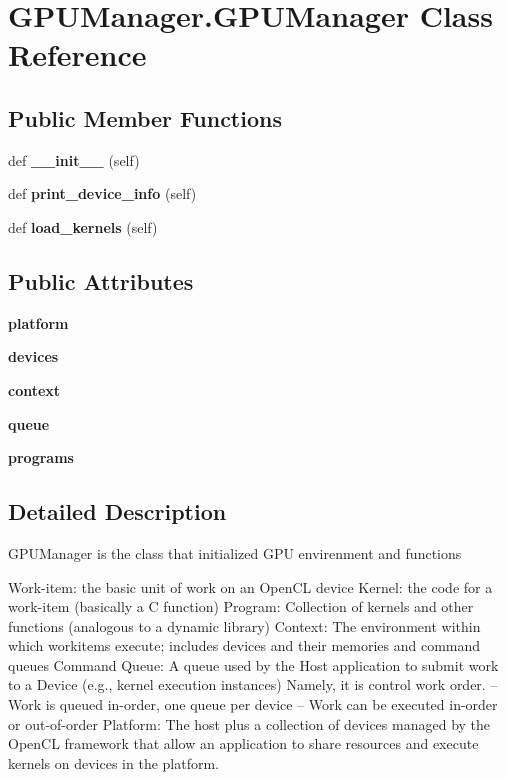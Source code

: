 \section{G\+P\+U\+Manager.\+G\+P\+U\+Manager Class Reference}
\label{class_g_p_u_manager_1_1_g_p_u_manager}
\subsection*{Public Member Functions}
\begin{DoxyCompactItemize}
\item 
def \textbf{ \+\_\+\+\_\+init\+\_\+\+\_\+} (self)
\item 
def \textbf{ print\+\_\+device\+\_\+info} (self)
\item 
def \textbf{ load\+\_\+kernels} (self)
\end{DoxyCompactItemize}
\subsection*{Public Attributes}
\begin{DoxyCompactItemize}
\item 
\mbox{\label{class_g_p_u_manager_1_1_g_p_u_manager_ae95df47a91b17aa5a9f045efd0547416}} 
{\bfseries platform}
\item 
\mbox{\label{class_g_p_u_manager_1_1_g_p_u_manager_aec4090621f66cd5d003c6c4d6a40ccaa}} 
{\bfseries devices}
\item 
\mbox{\label{class_g_p_u_manager_1_1_g_p_u_manager_a6c40884972be2350ea61b03a11339354}} 
{\bfseries context}
\item 
\mbox{\label{class_g_p_u_manager_1_1_g_p_u_manager_ad4d3c25e7aa7a1ecf7683d6c3a4a3350}} 
{\bfseries queue}
\item 
\mbox{\label{class_g_p_u_manager_1_1_g_p_u_manager_ae25153bc81d73a1744fa80d8c994ee06}} 
{\bfseries programs}
\end{DoxyCompactItemize}


\subsection{Detailed Description}
\begin{DoxyVerb}GPUManager is the class that initialized GPU envirenment and functions

Work-item: the basic unit of work on an OpenCL device
Kernel: the code for a work-item (basically a C function)
Program: Collection of kernels and other functions (analogous to a dynamic library)
Context: The environment within which workitems execute; includes devices and their memories and command queues
Command Queue: A queue used by the Host application to submit work to a Device (e.g., kernel execution instances)
                Namely, it is control work order.
   – Work is queued in-order, one queue per device
   – Work can be executed in-order or out-of-order
Platform: The host plus a collection of devices managed by the OpenCL framework that allow an application to share resources and execute kernels on devices in the platform.
\end{DoxyVerb}
 

